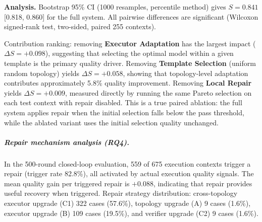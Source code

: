 \documentclass[manuscript,review,anonymous]{acmart}
\begin{document}
\begin{table}[t]
\centering
\caption{Core module ablation on Water QA (500 rounds). $\Delta S$ = full $-$ ablated (positive = full is better). \emph{w/o Local Repair} is measured by running the same Pareto selection on each test context with repair disabled; the quality difference is the true test-time repair contribution. All pairwise differences are significant (Wilcoxon signed-rank test, $n=255$, $p<0.01$).}
\label{tab:ablation_repair}
\end{table}

\textbf{Analysis.} Bootstrap 95\% CI (1000 resamples, percentile method) gives $S=0.841$ [0.818, 0.860] for the full system. All pairwise differences are significant (Wilcoxon signed-rank test, two-sided, paired 255 contexts).

Contribution ranking: removing \textbf{Executor Adaptation} has the largest impact ($\Delta S=+0.098$), suggesting that selecting the optimal model within a given template is the primary quality driver. Removing \textbf{Template Selection} (uniform random topology) yields $\Delta S=+0.058$, showing that topology-level adaptation contributes approximately 5.8\% quality improvement. Removing \textbf{Local Repair} yields $\Delta S=+0.009$, measured directly by running the same Pareto selection on each test context with repair disabled. This is a true paired ablation: the full system applies repair when the initial selection falls below the pass threshold, while the ablated variant uses the initial selection quality unchanged.

\subparagraph{Repair mechanism analysis (RQ4).}
In the 500-round closed-loop evaluation, 559 of 675 execution contexts trigger a repair (trigger rate 82.8\%), all activated by actual execution quality signals. The mean quality gain per triggered repair is $+0.088$, indicating that repair provides useful recovery when triggered. Repair strategy distribution: cross-topology executor upgrade (C1) 322 cases (57.6\%), topology upgrade (A) 9 cases (1.6\%), executor upgrade (B) 109 cases (19.5\%), and verifier upgrade (C2) 9 cases (1.6\%).
\end{document}
